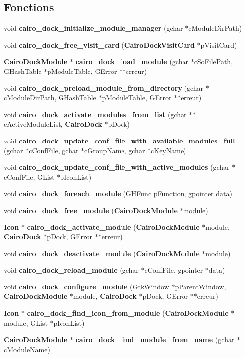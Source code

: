 \subsection*{Fonctions}
\begin{CompactItemize}
\item 
void {\bf cairo\_\-dock\_\-initialize\_\-module\_\-manager} (gchar $\ast$cModuleDirPath)
\item 
void {\bf cairo\_\-dock\_\-free\_\-visit\_\-card} ({\bf CairoDockVisitCard} $\ast$pVisitCard)
\item 
{\bf CairoDockModule} $\ast$ {\bf cairo\_\-dock\_\-load\_\-module} (gchar $\ast$cSoFilePath, GHashTable $\ast$pModuleTable, GError $\ast$$\ast$erreur)
\item 
void {\bf cairo\_\-dock\_\-preload\_\-module\_\-from\_\-directory} (gchar $\ast$cModuleDirPath, GHashTable $\ast$pModuleTable, GError $\ast$$\ast$erreur)
\item 
void {\bf cairo\_\-dock\_\-activate\_\-modules\_\-from\_\-list} (gchar $\ast$$\ast$cActiveModuleList, {\bf CairoDock} $\ast$pDock)
\item 
void {\bf cairo\_\-dock\_\-update\_\-conf\_\-file\_\-with\_\-available\_\-modules\_\-full} (gchar $\ast$cConfFile, gchar $\ast$cGroupName, gchar $\ast$cKeyName)
\item 
void {\bf cairo\_\-dock\_\-update\_\-conf\_\-file\_\-with\_\-active\_\-modules} (gchar $\ast$cConfFile, GList $\ast$pIconList)
\item 
void {\bf cairo\_\-dock\_\-foreach\_\-module} (GHFunc pFunction, gpointer data)
\item 
void {\bf cairo\_\-dock\_\-free\_\-module} ({\bf CairoDockModule} $\ast$module)
\item 
{\bf Icon} $\ast$ {\bf cairo\_\-dock\_\-activate\_\-module} ({\bf CairoDockModule} $\ast$module, {\bf CairoDock} $\ast$pDock, GError $\ast$$\ast$erreur)
\item 
void {\bf cairo\_\-dock\_\-deactivate\_\-module} ({\bf CairoDockModule} $\ast$module)
\item 
void {\bf cairo\_\-dock\_\-reload\_\-module} (gchar $\ast$cConfFile, gpointer $\ast$data)
\item 
void {\bf cairo\_\-dock\_\-configure\_\-module} (GtkWindow $\ast$pParentWindow, {\bf CairoDockModule} $\ast$module, {\bf CairoDock} $\ast$pDock, GError $\ast$$\ast$erreur)
\item 
{\bf Icon} $\ast$ {\bf cairo\_\-dock\_\-find\_\-icon\_\-from\_\-module} ({\bf CairoDockModule} $\ast$module, GList $\ast$pIconList)
\item 
{\bf CairoDockModule} $\ast$ {\bf cairo\_\-dock\_\-find\_\-module\_\-from\_\-name} (gchar $\ast$cModuleName)
\end{CompactItemize}


